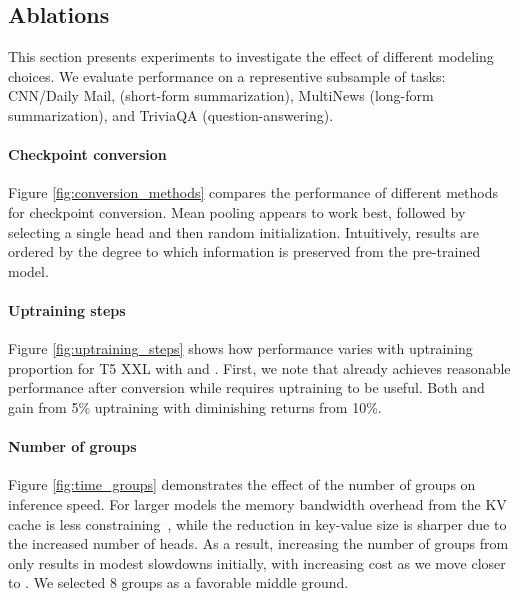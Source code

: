 \documentclass[11pt]{article}
\begin{document}
\subsection{Ablations}

This section presents experiments to investigate the effect of different modeling choices. We evaluate performance on a representive subsample of tasks: CNN/Daily Mail, (short-form summarization), MultiNews (long-form summarization), and TriviaQA (question-answering).


\paragraph{Checkpoint conversion}
Figure \ref{fig:conversion_methods} compares the performance of different methods for checkpoint conversion. Mean pooling appears to work best, followed by selecting a single head and then random initialization. Intuitively, results are ordered by the degree to which information is preserved from the pre-trained model.



\paragraph{Uptraining steps}
Figure \ref{fig:uptraining_steps} shows how performance varies with uptraining proportion for T5 XXL with \mq and \gmq. First, we note that \gmq already achieves reasonable performance after conversion while \mq requires uptraining to be useful. Both \mq and \gmq gain from 5\% uptraining with diminishing returns from 10\%.



\paragraph{Number of groups}

Figure \ref{fig:time_groups} demonstrates the effect of the number of \gmq groups on inference speed. For larger models the memory bandwidth overhead from the KV cache is less constraining~\citep{shazeer2019mq}, while the reduction in key-value size is sharper due to the increased number of heads. As a result, increasing the number of groups from \mq only results in modest slowdowns initially, with increasing cost as we move closer to \mh. We selected 8 groups as a favorable middle ground.



\end{document}
